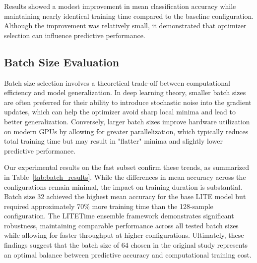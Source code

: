 \documentclass[conference]{IEEEtran}
\begin{document}
Results showed a modest improvement in mean classification accuracy while maintaining nearly identical training time compared to the baseline configuration. Although the improvement was relatively small, it demonstrated that optimizer selection can influence predictive performance.

\subsection{Batch Size Evaluation}

Batch size selection involves a theoretical trade-off between computational efficiency and model generalization. In deep learning theory, smaller batch sizes are often preferred for their ability to introduce stochastic noise into the gradient updates, which can help the optimizer avoid sharp local minima and lead to better generalization. Conversely, larger batch sizes improve hardware utilization on modern GPUs by allowing for greater parallelization, which typically reduces total training time but may result in "flatter" minima and slightly lower predictive performance.

Our experimental results on the fast subset confirm these trends, as summarized in Table~\ref{tab:batch_results}. While the differences in mean accuracy across the configurations remain minimal, the impact on training duration is substantial. Batch size 32 achieved the highest mean accuracy for the base LITE model but required approximately 70\% more training time than the 128-sample configuration. The LITETime ensemble framework demonstrates significant robustness, maintaining comparable performance across all tested batch sizes while allowing for faster throughput at higher configurations. Ultimately, these findings suggest that the batch size of 64 chosen in the original study represents an optimal balance between predictive accuracy and computational training cost.
\end{document}
